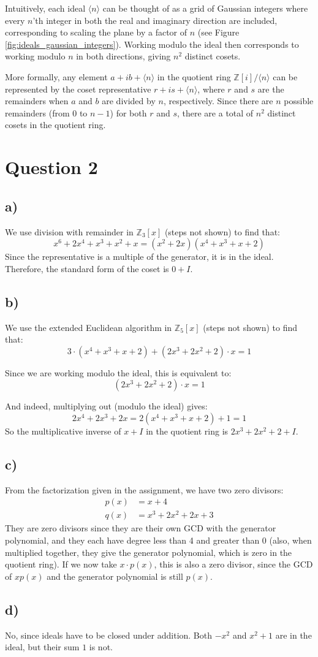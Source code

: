 \documentclass[a4paper,12pt]{article}
\begin{document}
Intuitively, each ideal $\langle n\rangle $ can be thought of as a grid of Gaussian integers where every $n$'th integer in both the real and imaginary direction are included, corresponding to scaling the plane by a factor of $n$ (see Figure \ref{fig:ideals_gaussian_integers}). Working modulo the ideal then corresponds to working modulo $n$ in both directions, giving $n^2$ distinct cosets.

More formally, any element $a + ib + \langle n \rangle$ in the quotient ring $\mathbb{Z}[i] / \langle n \rangle$ can be represented by the coset representative $r + i s + \langle n \rangle$, where $r$ and $s$ are the remainders when $a$ and $b$ are divided by $n$, respectively. Since there are $n$ possible remainders (from $0$ to $n-1$) for both $r$ and $s$, there are a total of $n^2$ distinct cosets in the quotient ring.

\newpage
\section*{Question 2}

\subsection*{a)}

We use division with remainder in $\mathbb{Z}_3[x]$ (steps not shown) to find that:
\[
x^6 + 2x^4 + x^3 + x^2 + x = (x^2 + 2x)(x^4 + x^3 + x + 2)
\]
Since the representative is a multiple of the generator, it is in the ideal. Therefore, the standard form of the coset is $0 + I$.

\subsection*{b)}
We use the extended Euclidean algorithm in $\mathbb{Z}_5[x]$ (steps not shown) to find that:
\[
3 \cdot (x^4 + x^3 + x + 2) + (2x^3 + 2x^2 + 2) \cdot x = 1
\]

Since we are working modulo the ideal, this is equivalent to:
\[
(2x^3 + 2x^2 + 2) \cdot x = 1
\]

And indeed, multiplying out (modulo the ideal) gives:
\[
2x^4 + 2x^3 + 2x = 2(x^4 + x^3 + x + 2) + 1 = 1
\]
So the multiplicative inverse of $x + I$ in the quotient ring is $2x^3 + 2x^2 + 2 + I$.


\subsection*{c)}
From the factorization given in the assignment, we have two zero divisors:
\begin{align*}
    p(x) &= x + 4 \\
    q(x) &= x^3 + 2x^2 + 2x + 3
\end{align*}
They are zero divisors since they are their own GCD with the generator polynomial, and they each have degree less than 4 and greater than 0 (also, when multiplied together, they give the generator polynomial, which is zero in the quotient ring). If we now take $x \cdot p(x)$, this is also a zero divisor, since the GCD of $xp(x)$ and the generator polynomial is still $p(x)$.

\subsection*{d)}
No, since ideals have to be closed under addition. Both $-x^2$ and $x^2 + 1$ are in the ideal, but their sum $1$ is not.
\end{document}
